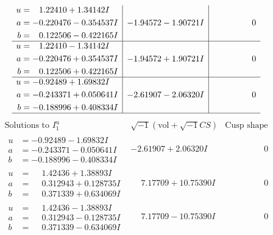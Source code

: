 \documentclass[1p]{elsarticle_modified}
\theoremstyle{definition}
\newcommand{\I}{\sqrt{-1}}
\begin{document}
$$\begin{array}{c|c|c}
\begin{aligned}
u &= \phantom{-}1.22410 + 1.34142 I \\
a &= -0.220476 - 0.354537 I \\
b &= \phantom{-}0.122506 - 0.422165 I\end{aligned}
 & -1.94572 - 1.90721 I & \phantom{-0.000000 } 0 \\ \hline\begin{aligned}
u &= \phantom{-}1.22410 - 1.34142 I \\
a &= -0.220476 + 0.354537 I \\
b &= \phantom{-}0.122506 + 0.422165 I\end{aligned}
 & -1.94572 + 1.90721 I & \phantom{-0.000000 } 0 \\ \hline\begin{aligned}
u &= -0.92489 + 1.69832 I \\
a &= -0.243371 + 0.050641 I \\
b &= -0.188996 + 0.408334 I\end{aligned}
 & -2.61907 - 2.06320 I & \phantom{-0.000000 } 0\\
 \hline 
 \end{array}$$\newpage$$\begin{array}{c|c|c}  
\text{Solutions to }I^u_{1}& \I (\text{vol} + \sqrt{-1}CS) & \text{Cusp shape}\\
 \hline 
\begin{aligned}
u &= -0.92489 - 1.69832 I \\
a &= -0.243371 - 0.050641 I \\
b &= -0.188996 - 0.408334 I\end{aligned}
 & -2.61907 + 2.06320 I & \phantom{-0.000000 } 0 \\ \hline\begin{aligned}
u &= \phantom{-}1.42436 + 1.38893 I \\
a &= \phantom{-}0.312943 + 0.128735 I \\
b &= \phantom{-}0.371339 + 0.634069 I\end{aligned}
 & \phantom{-}7.17709 + 10.75390 I & \phantom{-0.000000 } 0 \\ \hline\begin{aligned}
u &= \phantom{-}1.42436 - 1.38893 I \\
a &= \phantom{-}0.312943 - 0.128735 I \\
b &= \phantom{-}0.371339 - 0.634069 I\end{aligned}
 & \phantom{-}7.17709 - 10.75390 I & \phantom{-0.000000 } 0 \\ \hline\begin{aligned}

\end{aligned}
\end{array}$$
\end{document}
